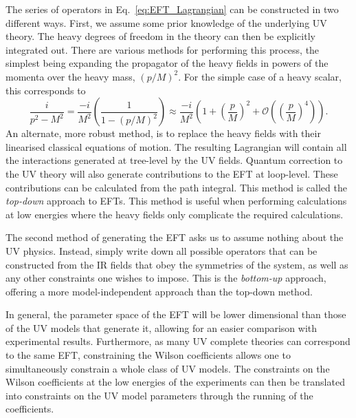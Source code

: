 The series of operators in Eq.~\ref*{eq:EFT_Lagrangian} can be constructed in two different ways. First, we assume some prior knowledge of the underlying UV theory. The heavy degrees of freedom in the theory can then be explicitly integrated out. There are various methods for performing this process, the simplest being expanding the propagator of the heavy fields in powers of the momenta over the heavy mass, $(p/M)^2$. For the simple case of a heavy scalar, this corresponds to 
\begin{equation}
    \frac{i}{p^2 - M^2} = \frac{-i}{M^2}\left(\frac{1}{1 - (p/M)^2}\right)\approx \frac{-i}{M^2}\left( 1 + \left(\frac{p}{M}\right)^2 + \mathcal{O}\left(\left(\frac{p}{M}\right)^4\right)\right).
\end{equation}
An alternate, more robust method, is to replace the heavy fields with their linearised classical equations of motion. The resulting Lagrangian will contain all the interactions generated at tree-level by the UV fields. Quantum correction to the UV theory will also generate contributions to the EFT at loop-level. These contributions can be calculated from the path integral. 
This method is called the \textit{top-down} approach to EFTs. This method is useful when performing calculations at low energies where the heavy fields only complicate the required calculations. 

The second method of generating the EFT asks us to assume nothing about the UV physics. Instead, simply write down all possible operators that can be constructed from the IR fields that obey the symmetries of the system, as well as any other constraints one wishes to impose. This is the \textit{bottom-up} approach, offering a more model-independent approach than the top-down method. 

In general, the parameter space of the EFT will be lower dimensional than those of the UV models that generate it, allowing for an easier comparison with experimental results. Furthermore, as many UV complete theories can correspond to the same EFT, constraining the Wilson coefficients allows one to simultaneously constrain a whole class of UV models. The constraints on the Wilson coefficients at the low energies of the experiments can then be translated into constraints on the UV model parameters through the running of the coefficients.

